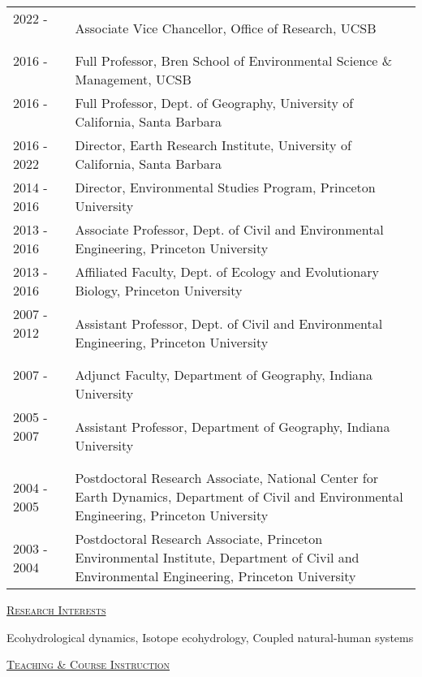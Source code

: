 \documentclass[10pt]{article}
\begin{document}
\begin{tabular}{l p{5.5in} }
2022 - \ \ \ \ & Associate Vice Chancellor, Office of Research, UCSB \\
2016 - \ \ \ \ & Full Professor, Bren School of Environmental Science \& Management, UCSB \\ 
2016 - \ \ \ \ & Full Professor, Dept. of Geography, University of California, Santa Barbara \\ 
2016 - 2022 & Director, Earth Research Institute, University of California, Santa Barbara \\ 
2014 - 2016 & Director, Environmental Studies Program, Princeton University \\
2013 - 2016 & Associate Professor, Dept. of Civil and Environmental Engineering, Princeton University \\
2013 - 2016 & Affiliated Faculty, Dept. of Ecology and Evolutionary Biology, Princeton University \\
2007 - 2012 \ \ \ \ & Assistant Professor, Dept. of Civil and Environmental Engineering, Princeton University \\
2007 - \ \ \ \ & Adjunct Faculty, Department of Geography, Indiana University \\ 
2005 - 2007 \ \ \ \  & Assistant Professor, Department of Geography, Indiana University \\
2004 - 2005 & Postdoctoral Research Associate, National Center for Earth Dynamics, Department of Civil and \mbox{Environmental} Engineering, Princeton University  \\
2003 - 2004 & Postdoctoral Research Associate, Princeton Environmental Institute, Department of Civil and \mbox{Environmental} Engineering, Princeton University  \\
\end{tabular}

\vspace*{.1in}
\textsc{\underline{Research Interests}}
\vspace*{.1in}

Ecohydrological dynamics, Isotope ecohydrology, Coupled natural-human systems

\vspace*{.1in}



\newpage

\textsc{\underline{Teaching \& Course Instruction}}
\end{document}
